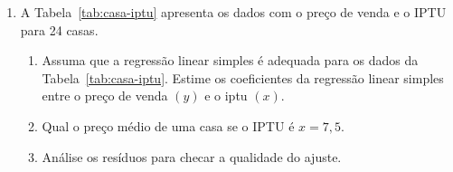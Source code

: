 \documentclass[12pt, a4paper]{article}
\begin{document}
\begin{enumerate}
	\item A Tabela~\ref{tab:casa-iptu} apresenta os dados com o preço de venda e o IPTU para 24 casas.
	\begin{table}[ht]
		\centering
		\caption{Preço e IPTU por metro quadrado de 24 casa em 1000 reais.} 
		\label{tab:casa-iptu}
	\end{table}
	\begin{enumerate}
		\item Assuma que a regressão linear simples é adequada para os dados da Tabela~\ref{tab:casa-iptu}. Estime os coeficientes da regressão linear simples entre o preço de venda $(y)$ e o iptu $(x)$.
		\item Qual o preço médio de uma casa se o IPTU é $x=7,5$.
		\item Análise os resíduos para checar a qualidade do ajuste.

\end{enumerate}
\end{enumerate}
\end{document}
